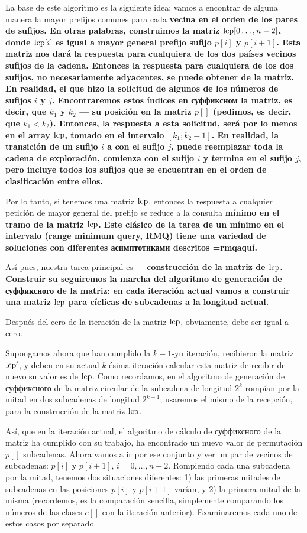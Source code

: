 La base de este algoritmo es la siguiente idea: vamos a encontrar de alguna manera la mayor prefijos comunes para cada \bf{vecina en el orden de los pares de sufijos}. En otras palabras, construimos la matriz ${\rm lcp}[0 \ldots, n-2]$, donde ${\rm lcp}[i]$ es igual a mayor general prefijo sufijo $p[i]$ y $p[i+1]$. Esta matriz nos dará la respuesta para cualquiera de los dos países vecinos sufijos de la cadena. Entonces la respuesta para cualquiera de los dos sufijos, no necesariamente adyacentes, se puede obtener de la matriz. En realidad, el que hizo la solicitud de algunos de los números de sufijos $i$ y $j$. Encontraremos estos índices en суффиксном la matriz, es decir, que $k_1$ y $k_2$ --- su posición en la matriz $p[]$ (pedimos, es decir, que $k_1 < k_2$). Entonces, la respuesta a esta solicitud, será por lo menos en el array $\rm lcp$, tomado en el intervalo $[k_1; k_2-1]$. En realidad, la transición de un sufijo $i$ a con el sufijo $j$, puede reemplazar toda la cadena de exploración, comienza con el sufijo $i$ y termina en el sufijo $j$, pero incluye todos los sufijos que se encuentran en el orden de clasificación entre ellos.

Por lo tanto, si tenemos una matriz $\rm lcp$, entonces la respuesta a cualquier petición de mayor general del prefijo se reduce a la consulta \bf{mínimo en el tramo} de la matriz $\rm lcp$. Este clásico de la tarea de un mínimo en el intervalo (range minimum query, RMQ) tiene una variedad de soluciones con diferentes асимптотиками descritos \algohref=rmq{aquí}.

Así pues, nuestra tarea principal es --- \bf{construcción} de la matriz de $\rm lcp$. Construir su seguiremos la marcha del algoritmo de generación de суффиксного de la matriz: en cada iteración actual vamos a construir una matriz $\rm lcp$ para cíclicas de subcadenas a la longitud actual.

Después del cero de la iteración de la matriz $\rm lcp$, obviamente, debe ser igual a cero.

Supongamos ahora que han cumplido la $k-1$-yu iteración, recibieron la matriz $\rm lcp^\prime$, y deben en su actual $k$-ésima iteración calcular esta matriz de recibir de nuevo su valor es de $\rm lcp$. Como recordamos, en el algoritmo de generación de суффиксного de la matriz circular de la subcadena de longitud $2^k$ rompían por la mitad en dos subcadenas de longitud $2^{k-1}$; usaremos el mismo de la recepción, para la construcción de la matriz $\rm lcp$.

Así, que en la iteración actual, el algoritmo de cálculo de суффиксного de la matriz ha cumplido con su trabajo, ha encontrado un nuevo valor de permutación $p[]$ subcadenas. Ahora vamos a ir por ese conjunto y ver un par de vecinos de subcadenas: $p[i]$ y $p[i+1]$, $i=0, \ldots, n-2$. Rompiendo cada una subcadena por la mitad, tenemos dos situaciones diferentes: 1) las primeras mitades de subcadenas en las posiciones $p[i]$ y $p[i+1]$ varían, y 2) la primera mitad de la misma (recordemos, es la comparación sencilla, simplemente comparando los números de las clases $c[]$ con la iteración anterior). Examinaremos cada uno de estos casos por separado.


